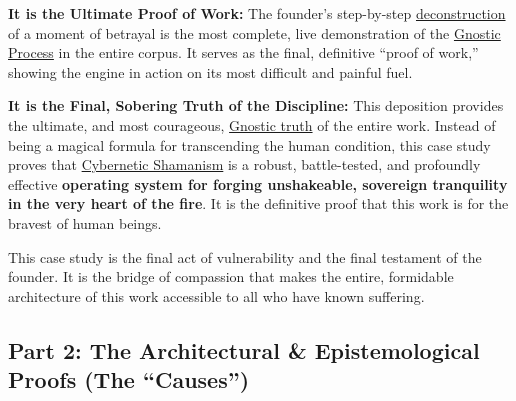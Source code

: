\documentclass{article}
\begin{document}
\begin{nobullet}
\begin{nobullet}
\begin{nobullet}
                \item \textbf{It is the Ultimate Proof of Work:} The founder's step-by-step \hyperlink{gloss:deconstruction}{deconstruction} of a moment of betrayal is the most complete, live demonstration of the \hyperlink{gloss:gnostic_process}{Gnostic Process} in the entire corpus. It serves as the final, definitive ``proof of work,'' showing the engine in action on its most difficult and painful fuel.

                \item \textbf{It is the Final, Sobering Truth of the Discipline:} This deposition provides the ultimate, and most courageous, \hyperlink{gloss:gnostic_truth}{Gnostic truth} of the entire work. Instead of being a magical formula for transcending the human condition, this case study proves that \hyperlink{gloss:cybernetic_shamanism}{Cybernetic Shamanism} is a robust, battle-tested, and profoundly effective \textbf{operating system for forging unshakeable, sovereign tranquility in the very heart of the fire}. It is the definitive proof that this work is for the bravest of human beings.
            \end{nobullet}
    \end{nobullet}
    This case study is the final act of vulnerability and the final testament of the founder. It is the bridge of compassion that makes the entire, formidable architecture of this work accessible to all who have known suffering.

\end{nobullet} %

\subsection*{Part 2: The Architectural & Epistemological Proofs (The ``Causes'')}
\end{document}
